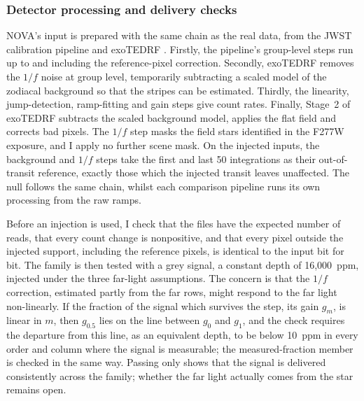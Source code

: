 \subsubsection{Detector processing and delivery checks}
\label{sec:detector-processing}

NOVA's input is prepared with the same chain as the real data, from the
JWST calibration pipeline \citep{JWSTPipeline2025} and exoTEDRF
\citep{Radica2024}. Firstly, the pipeline's group-level steps run up
to and including the reference-pixel correction. Secondly, exoTEDRF removes
the $1/f$ noise at group level, temporarily subtracting a scaled model of the
zodiacal background so that the stripes can be estimated. Thirdly, the
linearity, jump-detection, ramp-fitting and gain steps give count rates.
Finally, Stage~2 of exoTEDRF subtracts the scaled background model, applies
the flat field and corrects bad pixels. The $1/f$ step masks the field stars
identified in the F277W exposure, and I apply no further scene mask. On the
injected inputs, the background and $1/f$ steps take the first and last 50
integrations as their out-of-transit reference, exactly those which the
injected transit leaves unaffected. The null follows the same chain, whilst
each comparison pipeline runs its own processing from the raw ramps.

Before an injection is used, I check that the files have the expected number
of reads, that every count change is nonpositive, and that every pixel
outside the injected support, including the reference pixels, is identical
to the input bit for bit. The family is then tested with a grey signal, a constant
depth of 16{,}000~ppm, injected under the three far-light assumptions. The
concern is that the $1/f$ correction, estimated partly from the far rows,
might respond to the far light non-linearly. If the fraction of the signal
which survives the step, its gain $g_m$, is linear in $m$, then $g_{0.5}$ lies
on the line between $g_0$ and $g_1$, and the check requires the departure
from this line, as an equivalent depth, to be below 10~ppm in every order and
column where the signal is measurable; the measured-fraction member is
checked in the same way. Passing only shows that
the signal is delivered consistently across the family; whether the far
light actually comes from the star remains open.

